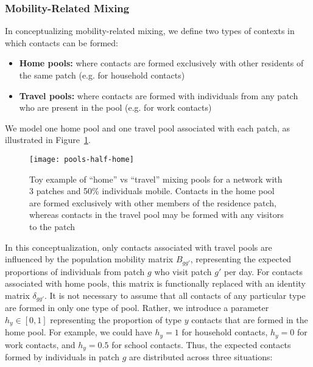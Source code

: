 \subsubsection{Mobility-Related Mixing}\label{meth.prop.mix.mob}
In conceptualizing mobility-related mixing,
we define two types of contexts in which contacts can be formed:
\begin{itemize}
  \item \textbf{Home pools:} where contacts are formed exclusively with
  other residents of the same patch (e.g. for household contacts)
  \item \textbf{Travel pools:} where contacts are formed with
  individuals from any patch who are present in the pool (e.g. for work contacts)
\end{itemize}
We model one home pool and one travel pool associated with each patch,
as illustrated in Figure~\ref{fig:pools}.
\begin{figure}
  \centering
  \texttt{[image: pools-half-home]}
  \caption{Toy example of ``home'' vs ``travel'' mixing pools
    for a network with 3 patches and 50\% individuals mobile.
    Contacts in the home pool are formed exclusively with other members of the residence patch,
    whereas contacts in the travel pool may be formed with any visitors to the patch}
  \label{fig:pools}
\end{figure}
\par
In this conceptualization, only contacts associated with travel pools are influenced by
the population mobility matrix $B_{gg'}$,
representing the expected proportions of individuals from patch $g$ who visit patch $g'$ per day.
For contacts associated with home pools, this matrix is functionally replaced with
an identity matrix $\delta_{gg'}$.
It is not necessary to assume that
all contacts of any particular type are formed in only one type of pool.
Rather, we introduce a parameter $h_y \in [0,1]$ representing
the proportion of type $y$ contacts that are formed in the home pool.
For example, we could have
$h_y = 1$ for household contacts, $h_y = 0$ for work contacts, and $h_y = 0.5$ for school contacts.
Thus, the expected contacts formed by individuals in patch $g$ are distributed across three situations:
